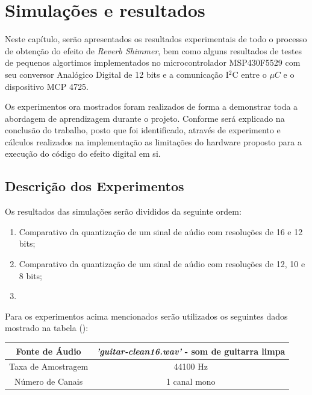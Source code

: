 \chapter{Simulações e resultados}
	Neste capítulo, serão apresentados os resultados experimentais de todo o processo de obtenção do efeito de \textit{Reverb Shimmer}, bem como alguns resultados de testes de pequenos algortimos implementados no microcontrolador MSP430F5529 com seu conversor Analógico Digital de 12 bits e a comunicação I$ ^2 $C entre o $ \mu C $ e o dispositivo MCP 4725.
	
	Os experimentos ora mostrados foram realizados de forma a demonstrar toda a abordagem de aprendizagem durante o projeto. Conforme será explicado na conclusão do trabalho, posto que foi identificado, através de experimento e cálculos realizados na implementação as limitações do hardware proposto para a execução do código do efeito digital em si.

	\section{Descrição dos Experimentos}
		
		Os resultados das simulações serão divididos da seguinte ordem:
		
		\begin{enumerate}
			\item Comparativo da quantização de um sinal de aúdio com resoluções de 16 e 12 bits;
			\item Comparativo da quantização de um sinal de aúdio com resoluções de 12, 10 e 8 bits;
			\item 
		\end{enumerate}
	
		Para os experimentos acima mencionados serão utilizados os seguintes dados mostrado na tabela ():
		
		\begin{tabular}[ht!]{|c|c|}
			\hline 
			Fonte de Áudio		&	\textit{'guitar-clean16.wav'} - som de guitarra limpa\\
			\hline
			Taxa de Amostragem 	&	44100 Hz	\\
			\hline
			Número de Canais 	&	1 canal mono\\ 
			\hline

		\end{tabular}
		
